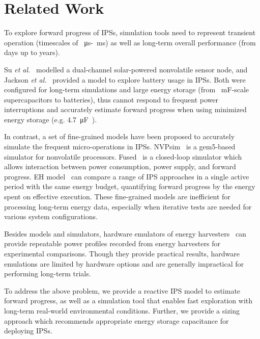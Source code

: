 \section{Related Work} \label{sec:c4_review}

To explore forward progress of IPSs, simulation tools need to represent transient operation (timescales of \SI{}{\micro\second}-\SI{}{\milli\second}) as well as long-term overall performance (from days up to years). 

Su \textit{et al.}~\cite{Su:2019:TFR:3340300.3320270} modelled a dual-channel solar-powered nonvolatile sensor node, and Jackson \textit{et al.}~\cite{Jackson:2019:COC:3302506.3310400} provided a model to explore battery usage in IPSs. Both were configured for long-term simulations and large energy storage (from \SI{}{\milli\farad}-scale supercapacitors to batteries), thus cannot respond to frequent power interruptions and accurately estimate forward progress when using minimized energy storage (e.g. \SI{4.7}{\micro\farad}~\cite{10.1145/3281300}).

In contrast, a set of fine-grained models have been proposed to accurately simulate the frequent micro-operations in IPSs. 
NVPsim~\cite{7428003} is a gem5-based simulator for nonvolatile processors.
Fused~\cite{sliper2020fused} is a closed-loop simulator which allows interaction between power consumption, power supply, and forward progress. EH model~\cite{8574572} can compare a range of IPS approaches in a single active period with the same energy budget, quantifying forward progress by the energy spent on effective execution. These fine-grained models are inefficient for processing long-term energy data, especially when iterative tests are needed for various system configurations. 

Besides models and simulators, hardware emulators of energy harvesters~\cite{10.1145/2668332.2668336, 10.1145/3356250.3360042} can provide repeatable power profiles recorded from energy harvesters for experimental comparisons. Though they provide practical results, hardware emulations are limited by hardware options and are generally impractical for performing long-term trials.

To address the above problem, we provide a reactive IPS model to estimate forward progress, as well as a simulation tool that enables fast exploration with long-term real-world environmental conditions. Further, we provide a sizing approach which recommends appropriate energy storage capacitance for deploying IPSs. 